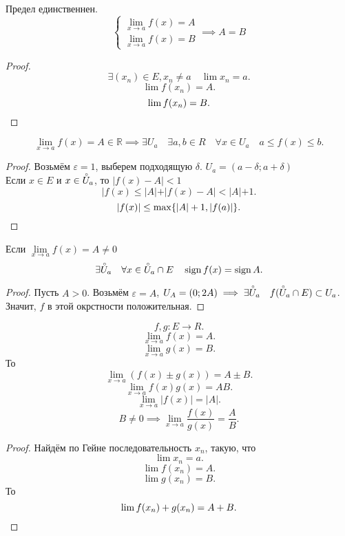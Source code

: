 \documentclass[11pt, oneside]{article}   	%
\DeclareMathOperator{\sign}{sign}
\begin{document}
        \begin{dlemma}
            Предел единственнен.
            \begin{equation*}
                \begin{cases}
                    \lim\limits_{x \to a} f(x) = A\\
                    \lim\limits_{x \to a} f(x) = B
                \end{cases}
                \implies A = B
            \end{equation*}
            \begin{proof}
                \[ \exists{(x_n)\in E, x_n \neq a}\quad \lim x_n = a .\] 
                \[ \lim f(x_n) = A .\]
                \[ \lim f(x_n) = B .\qedhere\] 
            \end{proof}
        \end{dlemma}
        \begin{dlemma} 
            \[\lim\limits_{x \to a} f(x) = A\in \mathbb{R} \implies  \exists{U_a}\quad \exists{a, b\in R}\quad  \forall{x\in U_a}\quad a \le f(x) \le b  .\]
            \begin{proof}
                Возьмём $\varepsilon=1$, выберем подходящую $\delta$.  $U_a = \left( a-\delta; a+\delta \right) $ \\
                Если $x\in E$ и $x\in \accentset{\circ}{U}_a$, то $|f(x) - A| < 1$\\
                \[ |f(x) \le |A| + |f(x)-A| < |A|+1.\]
                \[ |f(x)| \le\max \{|A|+1, |f(a)|\}  .\qedhere\] 
            \end{proof}
        \end{dlemma}
        \begin{dlemma}
            Если $\lim\limits_{x \to a} f(x) = A \neq 0$
            \[ \exists{\accentset{\circ}{U}_a}\quad \forall{x\in \accentset{\circ}{U}_a\cap E}\quad \sign{f(x)}=\sign{A} .\]
            \begin{proof}
                Пусть $A>0$. Возьмём $\varepsilon=A$, $U_A = \left( 0; 2A \right) \implies \exists{\accentset{\circ}{U}_a}\quad f(\accentset{\circ}{U}_a\cap E) \subset U_a$.
                Значит, $f$ в этой окрстности положительная.
            \end{proof}
        \end{dlemma}
        \begin{dlemma}
            \[ f, g: E \to R .\] 
            \[ \lim\limits_{x \to a} f(x) = A .\] 
            \[ \lim\limits_{x \to a} g(x) = B .\] 
            То
            \[ \lim\limits_{x \to a} (f(x)\pm g(x)) = A\pm B .\]
            \[ \lim\limits_{x \to a} f(x)g(x) = AB .\] 
            \[ \lim\limits_{x \to a} |f(x)| = |A| .\] 
            \[ B \neq 0 \implies \lim\limits_{x \to a} \frac{f(x)}{g(x)} = \frac{A}{B} .\] 
            \begin{proof}
               Найдём по Гейне последовательность $x_n$, такую, что
               \[ \lim x_n = a .\] 
               \[ \lim f(x_n) = A .\]
               \[ \lim g(x_n) = B .\]
               То
               \[ \lim f(x_n)+g(x_n) = A + B .\qedhere\]

            \end{proof}
        \end{dlemma}
\end{document}
